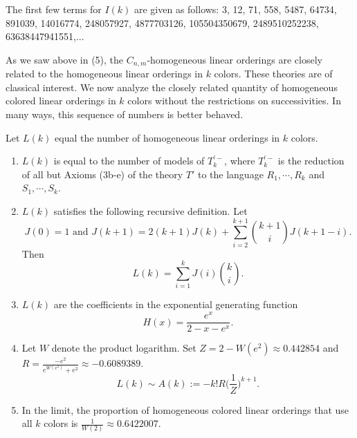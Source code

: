 \documentclass[11pt]{amsart}
\theoremstyle{definition}
\begin{document}
The first few terms for $I(k)$ are given as follows: 3, 12, 71, 558, 5487, 64734, 891039, 14016774, 248057927, 4877703126,
105504350679, 2489510252238, 63638447941551,...

As we saw above in (5), the $C_{n,m}$-homogeneous linear orderings are closely related to the homogeneous linear orderings in $k$ colors.
These theories are of classical interest.
We now analyze the closely related quantity of homogeneous colored linear orderings in $k$ colors without the restrictions on successivities.
In many ways, this sequence of numbers is better behaved.

\begin{theorem}
Let $L(k)$ equal the number of homogeneous linear orderings in $k$ colors.
    \begin{enumerate}
    \item $L(k)$ is equal to the number of models of $T^{'-}_k$, where $T^{'-}_k$ is the reduction of all but Axioms (3b-e) of the theory $T'$ to the language $R_1,\cdots,R_k$ and $S_1,\cdots,S_k$.
    \item $L(k)$ satisfies the following recursive definition.
    Let
    \[J(0)=1 \text{ and } J(k+1)= 2(k+1)J(k)+\sum_{i=2}^{k+1} {k+1 \choose i} J(k+1-i).\]
    Then
    \[L(k)=\sum_{i=1}^{k} J(i) {k \choose i}.\]
    \item $L(k)$ are the coefficients in the exponential generating function
    \[H(x)=\frac{e^x}{2-x-e^x}.\]
    \item Let $W$ denote the product logarithm. Set $Z=2-W(e^2)\approx0.442854$ and $R=\frac{-e^2}{e^{W(e^2)}+e^2}\approx-0.6089389$.
    \[L(k)\sim A(k):=-k!R\Big(\frac1{Z}\Big)^{k+1}.\]
    \item In the limit, the proportion of homogeneous colored linear orderings that use all $k$ colors is $\frac1{W(2)}\approx0.6422007.$
    \end{enumerate}
\end{theorem}
\end{document}
